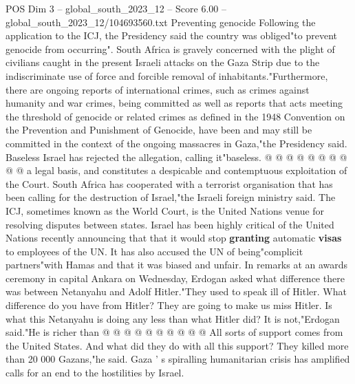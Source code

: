 \begin{textsample}{POS Dim 3 – global\_south\_2023\_12 – Score 6.00 – global\_south\_2023\_12/104693560.txt}
Preventing genocide Following the application to the ICJ, the Presidency said the country was obliged"to prevent genocide from occurring".
South Africa is gravely concerned with the plight of civilians caught in the present Israeli attacks on the Gaza Strip due to the indiscriminate use of force and forcible removal of inhabitants."Furthermore, there are ongoing reports of international crimes, such as crimes against humanity and war crimes, being committed as well as reports that acts meeting the threshold of genocide or related crimes as defined in the 1948 Convention on the Prevention and Punishment of Genocide, have been and may still be committed in the context of the ongoing massacres in Gaza,"the Presidency said.
Baseless Israel has rejected the allegation, calling it"baseless. @ @ @ @ @ @ @ @ @ @ a legal basis, and constitutes a despicable and contemptuous exploitation of the Court.
South Africa has cooperated with a terrorist organisation that has been calling for the destruction of Israel,"the Israeli foreign ministry said.
The ICJ, sometimes known as the World Court, is the United Nations venue for resolving disputes between states.
Israel has been highly critical of the United Nations recently announcing that that it would stop \textbf{granting} automatic \textbf{visas} to employees of the UN.
It has also accused the UN of being"complicit partners"with Hamas and that it was biased and unfair.
In remarks at an awards ceremony in capital Ankara on Wednesday, Erdogan asked what difference there was between Netanyahu and Adolf Hitler."They used to speak ill of Hitler.
What difference do you have from Hitler?
They are going to make us miss Hitler.
Is what this Netanyahu is doing any less than what Hitler did?
It is not,"Erdogan said."He is richer than @ @ @ @ @ @ @ @ @ @ All sorts of support comes from the United States.
And what did they do with all this support?
They killed more than 20 000 Gazans,"he said.
Gaza ' s spiralling humanitarian crisis has amplified calls for an end to the hostilities by Israel.

\end{textsample}
